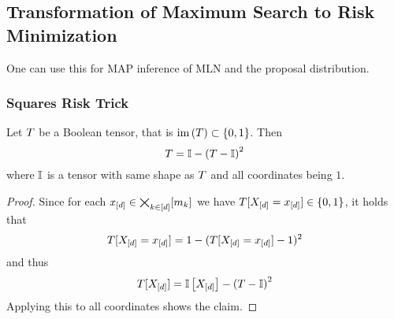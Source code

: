 





\subsection{Transformation of Maximum Search to Risk Minimization}

One can use this for MAP inference of MLN and the proposal distribution.


\subsubsection{Squares Risk Trick}

\begin{lemma}
	Let $T$ be a Boolean tensor, that is $\mathrm{im}\left(T\right)\subset\{0,1\}$.
	Then
		\[ T = \mathbb{I} - \left( T - \mathbb{I} \right)^2  \]
	where $\mathbb{I}$ is a tensor with same shape as $T$ and all coordinates being $1$.
\end{lemma}
\begin{proof}
	Since for each $x_{[d]}\in\bigtimes_{k\in[d]}[m_{k}]$ we have $T[X_{[d]}=x_{[d]}]\in\{0,1\}$, it holds that
		\[ T[X_{[d]}=x_{[d]}] = 1 - (T[X_{[d]}=x_{[d]}]-1)^2 \]
	and thus
		\[ T[X_{[d]}] = \mathbb{I}\left[X_{[d]}\right] - \left( T - \mathbb{I} \right)^2  \]
	Applying this to all coordinates shows the claim.
\end{proof}




